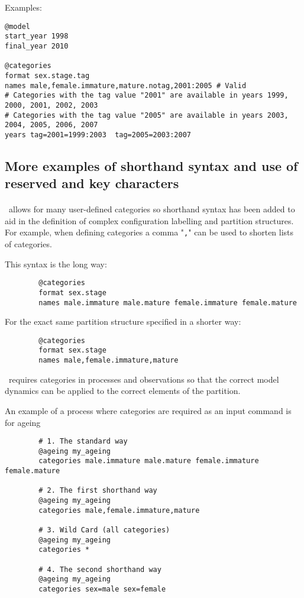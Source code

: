 Examples:

{\small{\begin{verbatim}
@model
start_year 1998
final_year 2010

@categories
format sex.stage.tag
names male,female.immature,mature.notag,2001:2005 # Valid
# Categories with the tag value "2001" are available in years 1999, 2000, 2001, 2002, 2003
# Categories with the tag value "2005" are available in years 2003, 2004, 2005, 2006, 2007
years tag=2001=1999:2003  tag=2005=2003:2007
\end{verbatim}}}

\subsection{More examples of shorthand syntax and use of reserved and key characters}\label{sec:ShorthandSyntax-section}

\paragraph*{\label{sub:categories}}

\CNAME\ allows for many user-defined categories so shorthand syntax has been added to aid in the definition of complex configuration labelling and partition structures. For example, when defining categories a comma "\texttt{,}" can be used to shorten lists of categories.

This syntax is the long way:

{\small{\begin{verbatim}
		@categories
		format sex.stage
		names male.immature male.mature female.immature female.mature
		\end{verbatim}}}

For the exact same partition structure specified in a shorter way:

{\small{\begin{verbatim}
		@categories
		format sex.stage
		names male,female.immature,mature
		\end{verbatim}}}

\CNAME\ requires categories in processes and observations so that the correct model dynamics can be applied to the correct elements of the partition.

An example of a process where categories are required as an input command is for ageing

{\small{\begin{verbatim}
		# 1. The standard way
		@ageing my_ageing
		categories male.immature male.mature female.immature female.mature

		# 2. The first shorthand way
		@ageing my_ageing
		categories male,female.immature,mature

		# 3. Wild Card (all categories)
		@ageing my_ageing
		categories *

		# 4. The second shorthand way
		@ageing my_ageing
		categories sex=male sex=female
		\end{verbatim}}}

